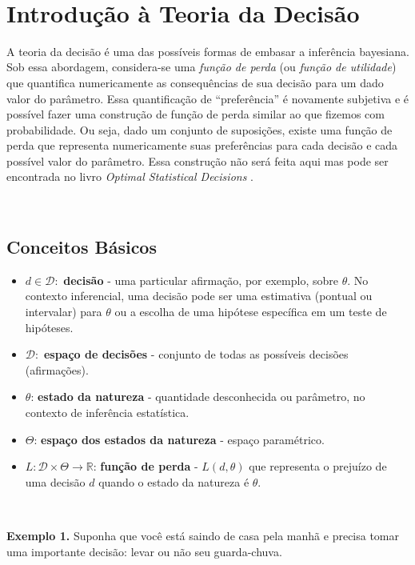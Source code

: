 \documentclass[
]{book}
\begin{document}
\(~\)

\hypertarget{TeoDec}{%
\chapter{Introdução à Teoria da Decisão}\label{TeoDec}}

A teoria da decisão é uma das possíveis formas de embasar a inferência bayesiana. Sob essa abordagem, considera-se uma \emph{função de perda} (ou \emph{função de utilidade}) que quantifica numericamente as consequências de sua decisão para um dado valor do parâmetro. Essa quantificação de ``preferência'' é novamente subjetiva e é possível fazer uma construção de função de perda similar ao que fizemos com probabilidade. Ou seja, dado um conjunto de suposições, existe uma função de perda que representa numericamente suas preferências para cada decisão e cada possível valor do parâmetro. Essa construção não será feita aqui mas pode ser encontrada no livro \emph{Optimal Statistical Decisions} \citep{DeGroot70}.

\(~\)

\hypertarget{BasDec}{%
\section{Conceitos Básicos}\label{BasDec}}

\begin{itemize}
\item
  \(d \in \mathcal{D}:\) \textbf{decisão} - uma particular afirmação, por exemplo, sobre \(\theta\). No contexto inferencial, uma decisão pode ser uma estimativa (pontual ou intervalar) para \(\theta\) ou a escolha de uma hipótese específica em um teste de hipóteses.
\item
  \(\mathcal{D}:\) \textbf{espaço de decisões} - conjunto de todas as possíveis decisões (afirmações).
\item
  \(\theta\): \textbf{estado da natureza} - quantidade desconhecida ou parâmetro, no contexto de inferência estatística.
\item
  \(\Theta\): \textbf{espaço dos estados da natureza} - espaço paramétrico.
\item
  \(L:\mathcal{D}\times\Theta\longrightarrow\mathbb{R}\): \textbf{função de perda} - \(L(d,\theta)\) que representa o prejuízo de uma decisão \(d\) quando o estado da natureza é \(\theta\).
\end{itemize}

\(~\)

\textbf{Exemplo 1.}
Suponha que você está saindo de casa pela manhã e precisa tomar uma importante decisão: levar ou não seu guarda-chuva.
\end{document}

